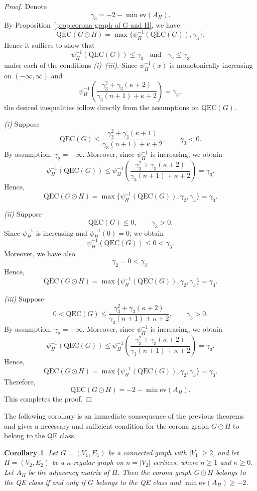 \documentclass[pdflatex,sn-mathphys-num]{sn-jnl}
\theoremstyle{thmstyleone}%
\newtheorem{corollary}[theorem]{Corollary}%
\theoremstyle{thmstyletwo}%
\theoremstyle{thmstylethree}%
\begin{document}
\begin{proof}
Denote
\[
\gamma_3 = -2 - \min \mathrm{ev}(A_H).
\]
By Proposition~\ref{prop:corona graph of G and H}, we have
\[
\mathrm{QEC}(G \odot H)
=
\max\{\psi_H^{-1}(\mathrm{QEC}(G)),\gamma_3\}.
\]
Hence it suffices to show that
\[
\psi_H^{-1}(\mathrm{QEC}(G)) \le \gamma_3 \;\; \text{ and }\;\; \gamma_2 \le \gamma_3
\]
under each of the conditions \textit{(i)}--\textit{(iii)}. Since $\psi_H^{-1}(x)$ is
monotonically increasing on $(-\infty,\infty)$ and
\[
\psi_H^{-1}\!\left(
\frac{\gamma_3^2 + \gamma_3(\kappa+2)}
{\gamma_3(n+1)+\kappa+2}
\right)
= \gamma_3,
\]
the desired inequalities follow directly from the assumptions on
$\mathrm{QEC}(G)$.

\medskip
\noindent
\textit{(i)} Suppose
\[
\mathrm{QEC}(G) \le
\frac{\gamma_3^2 + \gamma_3(\kappa+1)}
{\gamma_3(n+1)+\kappa+2},
\qquad \gamma_3 < 0.
\]
By assumption, $\gamma_2=-\infty$. Moreover, since $\psi_H^{-1}$ is increasing, we obtain
\[
\psi_H^{-1}(\mathrm{QEC}(G))
\le
\psi_H^{-1}\!\left(
\frac{\gamma_3^2 + \gamma_3(\kappa+2)}
{\gamma_3(n+1)+\kappa+2}
\right)
=
\gamma_3.
\]
Hence,
\[
\mathrm{QEC}(G \odot H)
=
\max\{\psi_H^{-1}(\mathrm{QEC}(G)),\gamma_2,\gamma_3\}
=
\gamma_3.
\]

\medskip
\noindent
\textit{(ii)} Suppose
\[
\mathrm{QEC}(G) \le 0,
\qquad \gamma_3 > 0.
\]
Since $\psi_H^{-1}$ is increasing and $\psi_H^{-1}(0)=0$, we obtain
\[
\psi_H^{-1}(\mathrm{QEC}(G)) \le 0 < \gamma_3.
\]
Moreover, we have also
\[\gamma_2=0<\gamma_3.\]
Hence,
\[
\mathrm{QEC}(G \odot H)
=
\max\{\psi_H^{-1}(\mathrm{QEC}(G)), \gamma_2,\gamma_3\}
=
\gamma_3.
\]

\medskip
\noindent
\textit{(iii)} Suppose
\[
0 < \mathrm{QEC}(G) \le
\frac{\gamma_3^2 + \gamma_3(\kappa+2)}
{\gamma_3(n+1)+\kappa+2},
\qquad \gamma_3 > 0.
\]
By assumption, $\gamma_2=-\infty$. Moreover, since $\psi_H^{-1}$ is increasing, we obtain
\[
\psi_H^{-1}(\mathrm{QEC}(G))
\le
\psi_H^{-1}\!\left(
\frac{\gamma_3^2 + \gamma_3(\kappa+2)}
{\gamma_3(n+1)+\kappa+2}
\right)
=
\gamma_3.
\]
Hence,
\[
\mathrm{QEC}(G \odot H)
=
\max\{\psi_H^{-1}(\mathrm{QEC}(G)), \gamma_2,\gamma_3\}
=
\gamma_3.
\]
Therefore,
\[
\mathrm{QEC}(G \odot H)
=
-2 - \min \mathrm{ev}(A_H).
\]
This completes the proof.
\end{proof}

The following corollary is an immediate consequence of the previous theorems and gives a necessary and sufficient condition for the corona graph $G\odot H$ to belong to the QE class.

\begin{corollary}
\label{corollary IV : corona QE class}
Let $G=(V_1,E_1)$ be a connected graph with $|V_1|\ge 2$, and let 
$H=(V_2,E_2)$ be a $\kappa$-regular graph on $n=|V_2|$ vertices, where $n\geq 1$ and $\kappa\geq 0$. 
Let $A_H$ be the adjacency matrix of $H$. Then the corona graph $G \odot H$ belongs to the QE class if and only if $G$ belongs to the QE class and $\min \mathrm{ev}(A_H) \ge -2$.
\end{corollary}
\end{document}
